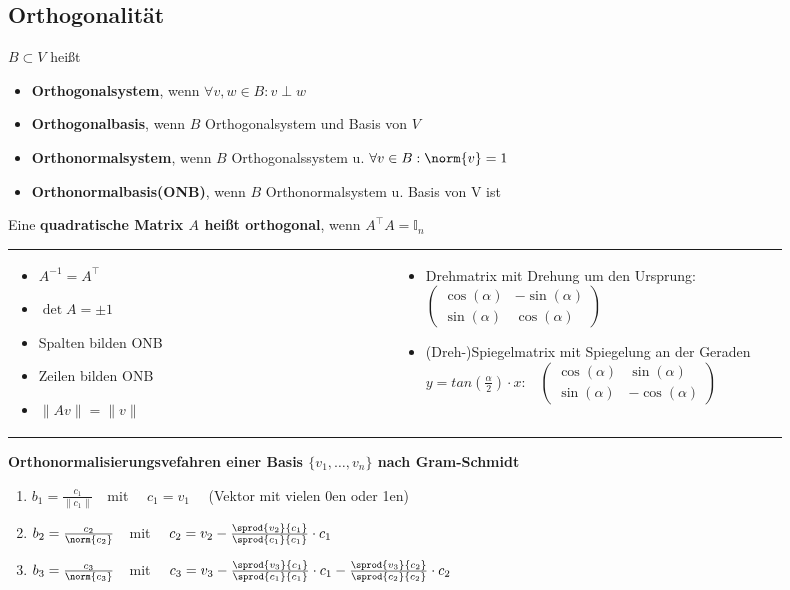 \documentclass[german, 6pt]{latex4ei/latex4ei_sheet}
\begin{document}
\subsection{Orthogonalität}
$B\subset V$ heißt
\begin{itemize}\itemsep0pt
\item \textbf{Orthogonalsystem}, wenn $\forall v,w\in B: v\perp w$
\item \textbf{Orthogonalbasis}, wenn $B$ Orthogonalsystem und Basis von $V$
\item \textbf{Orthonormalsystem}, wenn $B$ Orthogonalssystem u. $\forall v\in B: \norm{v}=1$
\item \textbf{Orthonormalbasis(ONB)},  wenn $B$ Orthonormalsystem u. Basis von V ist
\end{itemize}
Eine \textbf{quadratische Matrix $A$ heißt orthogonal}, wenn $A^\top A = \mathbb{I}_n$
\begin{tabular}{p{0.45\linewidth}p{0.45\linewidth}}
\begin{itemize}\itemsep6pt
\item $A^{-1}=A^\top $
\item $\det{A}=\pm1$
\item Spalten bilden ONB
\item Zeilen bilden ONB
\item $\|Av\|=\|v\|$ %
\end{itemize}
&
\begin{itemize}
\item Drehmatrix mit Drehung um den Ursprung:\ \
$\begin{pmatrix}
\cos(\alpha) & -\sin(\alpha)\\
\sin(\alpha) & \cos(\alpha)
\end{pmatrix}$
\item (Dreh-)Spiegelmatrix mit Spiegelung an der Geraden $y=tan(\frac{\alpha}{2})\cdot x$:\ \
$\begin{pmatrix}
\cos(\alpha) & \sin(\alpha)\\
\sin(\alpha) & -\cos(\alpha)
\end{pmatrix}$
\end{itemize}
\end{tabular}
\textbf{Orthonormalisierungsvefahren einer Basis $\{v_1,\ldots,v_n\}$ nach Gram-Schmidt}
\begin{enumerate}\itemsep0pt
\item $b_1=\frac{c_1}{\|c_1\|}$\ \ mit \ \ $c_1=v_1$ \ \ (Vektor mit vielen 0en oder 1en)
\item $b_{2}= \frac{c_2}{\norm{c_2}}$\ \ mit \ \ $c_2=v_2-\frac{\sprod{v_2}{c_1}}{\sprod{c_1}{c_1}}\cdot c_1$
\item $b_{3}= \frac{c_3}{\norm{c_3}}$\ \ mit \ \ $c_3=v_3-\frac{\sprod{v_3}{c_1}}{\sprod{c_1}{c_1}} \cdot c_1-\frac{\sprod{v_3}{c_2}}{\sprod{c_2}{c_2}}\cdot c_2$
\end{enumerate}
\end{document}
